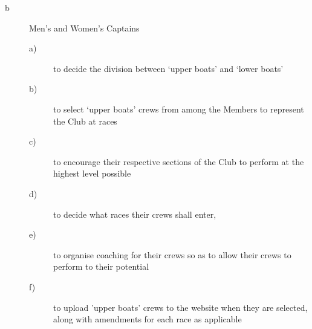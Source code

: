 \documentclass{article}
\begin{document}
\begin{description}
\begin{description}
\begin{description}
			\item[b] Men's and Women’s Captains
			\begin{description}
				\item[a)] to decide the division between ‘upper boats’ and ‘lower boats’
				\item[b)] to select ‘upper boats’ crews from among the Members to
				represent the Club at races
				\item[c)] to encourage their respective sections of the Club to perform at
				the highest level possible
				\item[d)] to decide what races their crews shall enter,
				\item[e)] to organise coaching for their crews so as to allow their crews to perform to their potential
				\item[f)] to upload 'upper boats' crews to the website when they are
				selected, along with amendments for each race as applicable
			\end{description}
		

\end{description}
\end{description}
\end{description}
\end{document}
